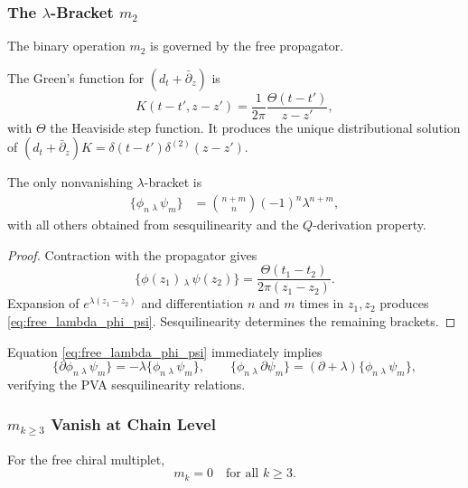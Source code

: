 \subsubsection{The $\lambda$-Bracket $m_2$}

The binary operation $m_2$ is governed by the free propagator.

\begin{construction}
\label{const:free_propagator_detailed}
The Green's function for $(d_t + \bar{\partial}_z)$ is
\[
K(t-t',z-z') = \frac{1}{2\pi} \frac{\Theta(t-t')}{z-z'},
\]
with $\Theta$ the Heaviside step function. It produces the unique distributional solution of $(d_t+\bar{\partial}_z)K = \delta(t-t')\delta^{(2)}(z-z')$.
\end{construction}

\begin{proposition}
\label{prop:free_lambda_brackets_detailed}
The only nonvanishing $\lambda$-bracket is
\begin{align}
\label{eq:free_lambda_phi_psi}
\{\phi_n \,{}_\lambda\, \psi_m\} &= \binom{n+m}{n} (-1)^n \lambda^{n+m},
\end{align}
with all others obtained from sesquilinearity and the $Q$-derivation property.
\end{proposition}

\begin{proof}
Contraction with the propagator gives
\[
\{\phi(z_1)\,{}_\lambda\,\psi(z_2)\} = \frac{\Theta(t_1-t_2)}{2\pi(z_1-z_2)}.
\]
Expansion of $e^{\lambda(z_1-z_2)}$ and differentiation $n$ and $m$ times in $z_1,z_2$ produces \eqref{eq:free_lambda_phi_psi}. Sesquilinearity determines the remaining brackets.
\end{proof}

\begin{remark}
Equation \eqref{eq:free_lambda_phi_psi} immediately implies
\[
\{\partial \phi_n \,{}_\lambda\, \psi_m\} = -\lambda \{\phi_n \,{}_\lambda\, \psi_m\},\qquad
\{\phi_n \,{}_\lambda\, \partial \psi_m\} = (\partial+\lambda)\{\phi_n \,{}_\lambda\, \psi_m\},
\]
verifying the PVA sesquilinearity relations.
\end{remark}

\subsubsection{$m_{k \geq 3}$ Vanish at Chain Level}

\begin{proposition}
\label{prop:free_mk_zero}
For the free chiral multiplet,
\[
m_k = 0 \quad \text{for all } k \geq 3.
\]
\end{proposition}

